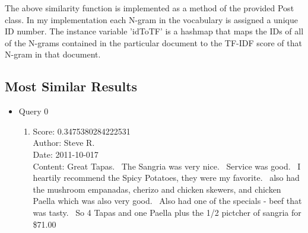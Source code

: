 \documentclass[paper=a4, fontsize=11pt]{jhwhw} %
\begin{document}
The above similarity function is implemented as a method of the provided Post class. In my implementation each N-gram in the vocabulary is assigned a unique ID number. The instance variable 'idToTF' is a hashmap that maps the IDs of all of the N-grams contained in the particular document to the TF-IDF score of that N-gram in that document. 

\subsection{Most Similar Results}
\begin{itemize}
    \item Query 0
        \begin{enumerate}
            \item Score: 0.3475380284222531\\
                Author: Steve R.\\
                Date: 2011-10-017\\
                Content: Great Tapas.  The Sangria was very nice.  Service was good.  I heartily recommend the Spicy Potatoes, they were my favorite.  also had the mushroom empanadas, cherizo and chicken skewers, and chicken Paella which was also very good.  Also had one of the specials - beef that was tasty.  So 4 Tapas and one Paella plus the 1/2 pictcher of sangria for \$71.00 


\end{enumerate}
\end{itemize}
\end{document}
